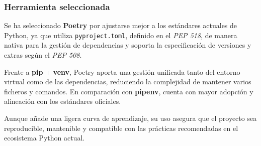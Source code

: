 \subsubsection{Herramienta seleccionada}
Se ha seleccionado \textbf{Poetry} por ajustarse mejor a los estándares actuales de Python, ya
que utiliza \texttt{pyproject.toml}, definido en el \textit{PEP 518}, de manera nativa para la
gestión de dependencias y soporta la especificación de versiones y extras según el \textit{PEP 508}.

Frente a \textbf{pip} + \textbf{venv}, Poetry aporta una gestión unificada tanto del entorno virtual 
como de las dependencias, reduciendo la complejidad de mantener varios ficheros y comandos. 
En comparación con \textbf{pipenv}, cuenta con mayor adopción y alineación con los estándares oficiales. 

Aunque añade una ligera curva de aprendizaje, su uso asegura que el proyecto sea reproducible, mantenible
y compatible con las prácticas recomendadas en el ecosistema Python actual.